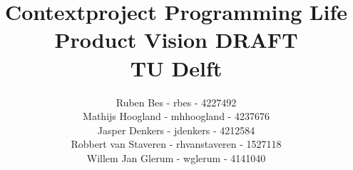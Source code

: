 \documentclass[a4paper]{article}
\title{
	{Contextproject Programming Life}\\
	{Product Vision DRAFT}\\
	{\large TU Delft}
}
\author{
	Ruben Bes - rbes - 4227492\\
	Mathijs Hoogland - mhhoogland - 4237676 \\
	Jasper Denkers - jdenkers - 4212584\\
	Robbert van Staveren - rhvanstaveren - 1527118\\
	Willem Jan Glerum - wglerum - 4141040
}
\begin{document}
\maketitle



\newpage
\tableofcontents
\newpage







{}

\end{document}
